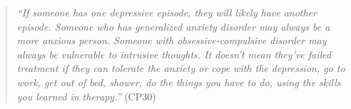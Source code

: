 \begin{quote}

\textit{``If someone has one depressive episode, they will likely have another episode.
Someone who has generalized anxiety disorder may always be a more anxious person. 
Someone with obsessive-compulsive disorder may always be vulnerable to intrusive thoughts. 
It doesn't mean they've failed treatment if they can tolerate the anxiety or cope with the depression, go to work, get out of bed, shower, do the things you have to do, using the skills you learned in therapy.''} (CP30)
\end{quote}

